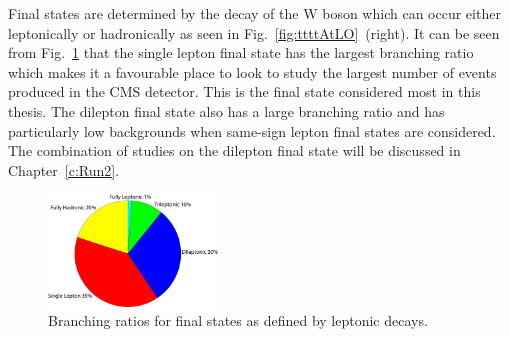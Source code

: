 Final states are determined by the decay of the W boson which can occur either leptonically or hadronically as seen in Fig.~\ref{fig:ttttAtLO}~(right). It can be seen from Fig.~\ref{fig:BRtttt} that the single lepton final state has the largest branching ratio which makes it a favourable place to look to study the largest number of events produced in the CMS detector. This is the final state considered most in this thesis. The dilepton final state also has a large branching ratio and has particularly low backgrounds when same-sign lepton final states are considered. The combination of studies on the dilepton final state will be discussed in Chapter~\ref{c:Run2}.

\begin{figure}[ht!]
\begin{center}
    \includegraphics[width=0.4\textwidth]{images/Theory/FourTopBR.pdf}
    \caption{Branching ratios for final states as defined by leptonic decays.}
    \label{fig:BRtttt}
\end{center}
\end{figure}

